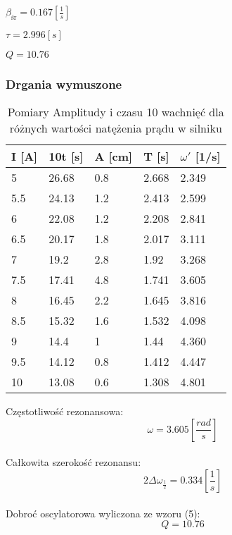 \documentclass[]{article}
\begin{document}
	$\beta_{\text{śr}} = 0.167 \left[ \frac{1}{s}\right] $
	
	$\tau=2.996[s]$
	
	$Q = 10.76$
	
	\subsubsection{Drgania wymuszone}
	
	\begin{table}[h]
		\centering
		\caption{Pomiary Amplitudy i czasu 10 wachnięć dla różnych wartości natężenia prądu w silniku}
		\begin{tabular}{|l|l|l|l|l|}
			\hline
			
			I [A] & 10t [s] & A [cm] & T [s] & $\omega'$ [1/s] \\ \hline
			5 & 26.68 & 0.8 & 2.668 & 2.349 \\ \hline
			5.5 & 24.13 & 1.2 & 2.413 & 2.599 \\ \hline
			6 & 22.08 & 1.2 & 2.208 & 2.841 \\ \hline
			6.5 & 20.17 & 1.8 & 2.017 & 3.111 \\ \hline
			7 & 19.2 & 2.8 & 1.92 & 3.268 \\ \hline
			7.5 & 17.41 & 4.8 & 1.741 & 3.605 \\ \hline
			8 & 16.45 & 2.2 & 1.645 & 3.816 \\ \hline
			8.5 & 15.32 & 1.6 & 1.532 & 4.098 \\ \hline
			9 & 14.4 & 1 & 1.44 & 4.360 \\ \hline
			9.5 & 14.12 & 0.8 & 1.412 & 4.447 \\ \hline
			10 & 13.08 & 0.6 & 1.308 & 4.801 \\ \hline
			
		\end{tabular}
	\end{table}
	
	Częstotliwość rezonansowa:
	$$\omega = 3.605 \left[ \frac{rad}{s}\right]$$\\
	Całkowita szerokość rezonansu:
	$$2\Delta\omega_{\frac{1}{2}} = 0.334 \left[ \frac{1}{s}\right] $$\\	
	Dobroć oscylatorowa wyliczona ze wzoru (5):
	$$Q = 10.76$$
	
\end{document}
